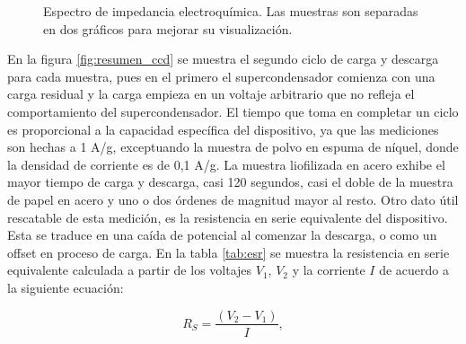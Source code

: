 \begin{figure}[h!]
\begin{subfigure}[t!]{0.4\textwidth}
	\end{subfigure}
	\caption{Espectro de impedancia electroquímica. Las muestras son separadas en dos gráficos para mejorar su visualización.}
	\label{fig:resumen_eis}
\end{figure}

En la figura \ref{fig:resumen_ccd} se muestra el segundo ciclo de carga y descarga para cada muestra, pues en el primero el supercondensador comienza con una carga residual y la carga empieza	 en un voltaje arbitrario que no refleja el comportamiento del supercondensador. El tiempo que toma en completar un ciclo es proporcional a la capacidad específica del dispositivo, ya que las mediciones son hechas a 1 A/g, exceptuando la muestra de polvo en espuma de níquel, donde la densidad de corriente es de 0,1 A/g.
La muestra liofilizada en acero exhibe el mayor tiempo de carga y descarga, casi 120 segundos, casi el doble de la muestra de papel en acero y uno o dos órdenes de magnitud mayor al resto.
Otro dato útil rescatable de esta medición, es la resistencia en serie equivalente del dispositivo. Esta se traduce en una caída de potencial al comenzar la descarga, o como un offset en proceso de carga. En la tabla \ref{tab:esr} se muestra la resistencia en serie equivalente calculada a partir de los voltajes $V_1$, $V_2$ y la corriente $I$ de acuerdo a la siguiente ecuación:

\begin{equation}
	R_{S}=\frac{\left(V_2-V_1\right)}{I},
\end{equation}

